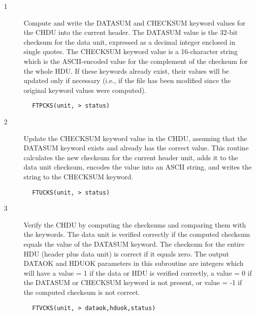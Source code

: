 \documentclass[11pt]{book}
\begin{document}
\begin{description}
\item[1 ] Compute and write the DATASUM and CHECKSUM keyword values for the CHDU
    into the current header.  The DATASUM value is the 32-bit checksum
    for the data unit, expressed as a decimal integer enclosed in single
    quotes. The CHECKSUM keyword value is a 16-character string which
    is the ASCII-encoded value for the complement of the checksum for
    the whole HDU.  If these keywords already exist, their values
    will be updated only if necessary (i.e., if the file has been modified
   since the original keyword values were computed).
\end{description}

\begin{verbatim}
        FTPCKS(unit, > status)
\end{verbatim}

\begin{description}
\item[2 ] Update the CHECKSUM keyword value in the CHDU, assuming that the
    DATASUM keyword exists and already has the correct value.  This routine
    calculates the new checksum for the current header unit, adds it to the
    data unit checksum, encodes the value into an ASCII string, and writes
   the string to the CHECKSUM keyword.
\end{description}

\begin{verbatim}
        FTUCKS(unit, > status)
\end{verbatim}

\begin{description}
\item[3 ] Verify the CHDU by computing the checksums and comparing
    them with the keywords.  The data unit is verified correctly
    if the computed checksum equals the value of the DATASUM
    keyword.  The checksum for the entire HDU (header plus data unit) is
    correct if it equals zero.  The output DATAOK and HDUOK parameters
    in this subroutine are integers which will have a value = 1
    if the data or HDU is verified correctly, a value = 0
    if the DATASUM or CHECKSUM keyword is not present, or value = -1
   if the computed checksum is not correct.
\end{description}

\begin{verbatim}
        FTVCKS(unit, > dataok,hduok,status)
\end{verbatim}
\end{document}
